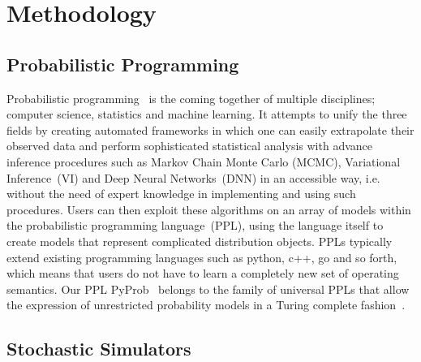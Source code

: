 \documentclass{article}
\begin{document}
\section{Methodology}

\subsection{Probabilistic Programming}
Probabilistic programming~\cite{gordon2014probabilistic,staton2016semantics,kozen1979semantics} is the coming together of multiple disciplines; computer science, statistics and machine learning. 
It attempts to unify the three fields by creating automated frameworks in which one can easily extrapolate their observed data and perform sophisticated statistical analysis with advance inference procedures such as 
Markov Chain Monte Carlo (MCMC), Variational Inference~(VI) and Deep Neural Networks~(DNN) in an accessible way, i.e. without the need of expert knowledge in implementing and using such procedures.
Users can then exploit these algorithms on an array of models
within the probabilistic programming language~(PPL), using the language itself to create models that represent complicated distribution objects. 
PPLs typically extend existing programming languages such as python, c++, go and so forth, which means that users do not have to learn
a completely new set of operating semantics.  
Our PPL PyProb~\cite{le-2016-inference,baydin2018efficient} belongs to the family of universal PPLs 
that allow the expression of unrestricted probability models in a Turing complete fashion~\cite{wood2014new,goodman2012church,landau_binder_2014,siddharth2017learning,bingham2019pyro}.

\subsection{Stochastic Simulators}
\end{document}
